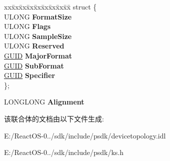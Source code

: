 \begin{DoxyCompactItemize}
\begin{tabbing}
xx\=xx\=xx\=xx\=xx\=xx\=xx\=xx\=xx\=\kill
struct \{\\
\>ULONG {\bfseries FormatSize}\\
\>ULONG {\bfseries Flags}\\
\>ULONG {\bfseries SampleSize}\\
\>ULONG {\bfseries Reserved}\\
\>\hyperlink{interface_g_u_i_d}{GUID} {\bfseries MajorFormat}\\
\>\hyperlink{interface_g_u_i_d}{GUID} {\bfseries SubFormat}\\
\>\hyperlink{interface_g_u_i_d}{GUID} {\bfseries Specifier}\\
\}; \\

\end{tabbing}\item 
\mbox{\label{struct_k_s_d_a_t_a_f_o_r_m_a_t_a6d13f523a837ebe26372f32b740b02d7}} 
L\+O\+N\+G\+L\+O\+NG {\bfseries Alignment}
\end{DoxyCompactItemize}


该联合体的文档由以下文件生成\+:\begin{DoxyCompactItemize}
\item 
E\+:/\+React\+O\+S-\/0../sdk/include/psdk/devicetopology.\+idl\item 
E\+:/\+React\+O\+S-\/0../sdk/include/psdk/ks.\+h\end{DoxyCompactItemize}
